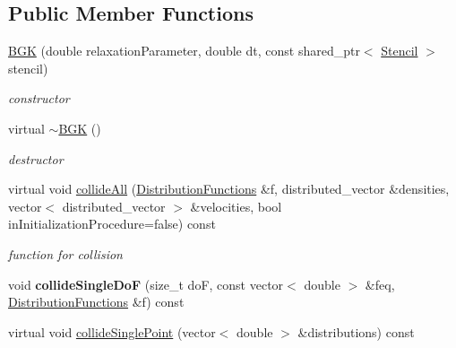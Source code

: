 \subsection*{Public Member Functions}
\begin{DoxyCompactItemize}
\item 
\hyperlink{classnatrium_1_1BGK_acb5fcbbec625b60d7f2db05e9e66fbaa}{BGK} (double relaxationParameter, double dt, const shared\_\-ptr$<$ \hyperlink{classnatrium_1_1Stencil}{Stencil} $>$ stencil)
\begin{DoxyCompactList}\small\item\em constructor \item\end{DoxyCompactList}\item 
\hypertarget{classnatrium_1_1BGK_a1029401a72788a6538e4e1941c305ab4}{
virtual \hyperlink{classnatrium_1_1BGK_a1029401a72788a6538e4e1941c305ab4}{$\sim$BGK} ()}
\label{classnatrium_1_1BGK_a1029401a72788a6538e4e1941c305ab4}

\begin{DoxyCompactList}\small\item\em destructor \item\end{DoxyCompactList}\item 
virtual void \hyperlink{classnatrium_1_1BGK_ae5e97a4995fe927e9042a6cffac80acc}{collideAll} (\hyperlink{classnatrium_1_1DistributionFunctions}{DistributionFunctions} \&f, distributed\_\-vector \&densities, vector$<$ distributed\_\-vector $>$ \&velocities, bool inInitializationProcedure=false) const 
\begin{DoxyCompactList}\small\item\em function for collision \item\end{DoxyCompactList}\item 
\hypertarget{classnatrium_1_1BGK_ab82471c249d19fdc62005fb8b7e03190}{
void {\bfseries collideSingleDoF} (size\_\-t doF, const vector$<$ double $>$ \&feq, \hyperlink{classnatrium_1_1DistributionFunctions}{DistributionFunctions} \&f) const }
\label{classnatrium_1_1BGK_ab82471c249d19fdc62005fb8b7e03190}

\item 
\hypertarget{classnatrium_1_1BGK_aebf6d64d5e537c2e352451667d9003d4}{
virtual void \hyperlink{classnatrium_1_1BGK_aebf6d64d5e537c2e352451667d9003d4}{collideSinglePoint} (vector$<$ double $>$ \&distributions) const }
\label{classnatrium_1_1BGK_aebf6d64d5e537c2e352451667d9003d4}


\end{DoxyCompactItemize}
